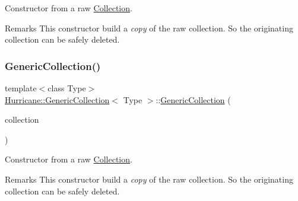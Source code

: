Constructor from a raw \mbox{\hyperlink{classHurricane_1_1Collection}{Collection}}.

\begin{DoxyRemark}{Remarks}
This constructor build a {\itshape copy} of the raw collection. So the originating collection can be safely deleted. 
\end{DoxyRemark}
\mbox{\label{classHurricane_1_1GenericCollection_a9b77dc014864c2248f31b9dfee242d25}} 
\subsubsection{\texorpdfstring{Generic\+Collection()}{GenericCollection()}\hspace{0.1cm}{\footnotesize\ttfamily [2/3]}}
{\footnotesize\ttfamily template$<$class Type$>$ \\
\mbox{\hyperlink{classHurricane_1_1GenericCollection}{Hurricane\+::\+Generic\+Collection}}$<$ Type $>$\+::\mbox{\hyperlink{classHurricane_1_1GenericCollection}{Generic\+Collection}} (\begin{DoxyParamCaption}\item[{const \mbox{\hyperlink{classHurricane_1_1GenericCollection}{Generic\+Collection}}$<$ Type $>$ \&}]{collection }\end{DoxyParamCaption})\hspace{0.3cm}{\ttfamily [inline]}}

Constructor from a raw \mbox{\hyperlink{classHurricane_1_1Collection}{Collection}}.

\begin{DoxyRemark}{Remarks}
This constructor build a {\itshape copy} of the raw collection. So the originating collection can be safely deleted. 
\end{DoxyRemark}
\mbox{\label{classHurricane_1_1GenericCollection_a8e4f70213efb85c0ba802b7de9c03b32}} 
